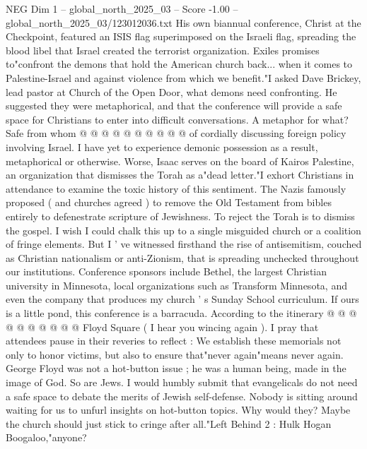 \begin{textsample}{NEG Dim 1 – global\_north\_2025\_03 – Score -1.00 – global\_north\_2025\_03/123012036.txt}
His own biannual conference, Christ at the Checkpoint, featured an ISIS flag superimposed on the Israeli flag, spreading the blood libel that Israel created the terrorist organization.
Exiles promises to"confront the demons that hold the American church back... when it comes to Palestine-Israel and against violence from which we benefit."I asked Dave Brickey, lead pastor at Church of the Open Door, what demons need confronting.
He suggested they were metaphorical, and that the conference will provide a safe space for Christians to enter into difficult conversations.
A metaphor for what?
Safe from whom @ @ @ @ @ @ @ @ @ @ of cordially discussing foreign policy involving Israel.
I have yet to experience demonic possession as a result, metaphorical or otherwise.
Worse, Isaac serves on the board of Kairos Palestine, an organization that dismisses the Torah as a"dead letter."I exhort Christians in attendance to examine the toxic history of this sentiment.
The Nazis famously proposed ( and churches agreed ) to remove the Old Testament from bibles entirely to defenestrate scripture of Jewishness.
To reject the Torah is to dismiss the gospel.
I wish I could chalk this up to a single misguided church or a coalition of fringe elements.
But I ' ve witnessed firsthand the rise of antisemitism, couched as Christian nationalism or anti-Zionism, that is spreading unchecked throughout our institutions.
Conference sponsors include Bethel, the largest Christian university in Minnesota, local organizations such as Transform Minnesota, and even the company that produces my church ' s Sunday School curriculum.
If ours is a little pond, this conference is a barracuda.
According to the itinerary @ @ @ @ @ @ @ @ @ @ Floyd Square ( I hear you wincing again ).
I pray that attendees pause in their reveries to reflect : We establish these memorials not only to honor victims, but also to ensure that"never again"means never again.
George Floyd was not a hot-button issue ; he was a human being, made in the image of God.
So are Jews.
I would humbly submit that evangelicals do not need a safe space to debate the merits of Jewish self-defense.
Nobody is sitting around waiting for us to unfurl insights on hot-button topics.
Why would they?
Maybe the church should just stick to cringe after all."Left Behind 2 : Hulk Hogan Boogaloo,"anyone?

\end{textsample}
